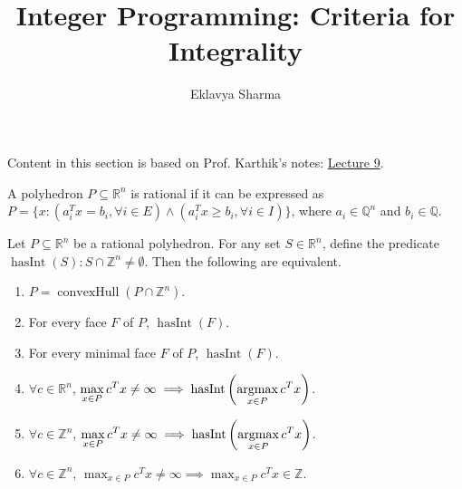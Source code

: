 \documentclass[a4paper,12pt,fleqn]{article}
\author{Eklavya Sharma}
\date{\empty}
\title{Integer Programming: Criteria for Integrality}
\DeclareMathOperator{\hasInt}{hasInt}
\newcommand*{\karthikLec}[1]{http://karthik.ise.illinois.edu/courses/ie511/lectures-sp-21/lecture-#1.pdf}
\newenvironment*{tightenum}{\begin{enumerate}[noitemsep]}{\end{enumerate}}
\begin{document}
\maketitle
\setlength{\parskip}{0.2em}

Content in this section is based on Prof. Karthik's notes: \href{\karthikLec{9}}{Lecture 9}.

\begin{definition}
A polyhedron $P \subseteq \mathbb{R}^n$ is rational if it can be expressed as
$P = \{x: (a_i^Tx = b_i, \forall i \in E) \wedge (a_i^Tx \ge b_i, \forall i \in I)\}$,
where $a_i \in \mathbb{Q}^n$ and $b_i \in \mathbb{Q}$.
\end{definition}

\begin{theorem}
Let $P \subseteq \mathbb{R}^n$ be a rational polyhedron.
For any set $S \in \mathbb{R}^n$, define the predicate
$\hasInt(S): S \cap \mathbb{Z}^n \neq \emptyset$.
Then the following are equivalent.
\begin{tightenum}
\item $P = \operatorname{convexHull}(P \cap \mathbb{Z}^n)$.
\item For every face $F$ of $P$, $\hasInt(F)$.
\item For every minimal face $F$ of $P$, $\hasInt(F)$.
\item $\forall c \in \mathbb{R}^n$,
$\displaystyle \max_{x \in P} c^Tx \neq \infty \implies \hasInt\left(\argmax_{x \in P} c^Tx\right)$.
\item $\forall c \in \mathbb{Z}^n$,
$\displaystyle \max_{x \in P} c^Tx \neq \infty \implies \hasInt\left(\argmax_{x \in P} c^Tx\right)$.
\item $\forall c \in \mathbb{Z}^n$,
$\displaystyle \max_{x \in P} c^Tx \neq \infty \implies \max_{x \in P} c^Tx \in \mathbb{Z}$.
\end{tightenum}
\end{theorem}
\end{document}
